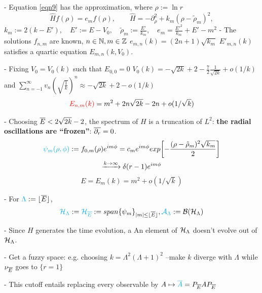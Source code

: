 {
    \color{gray}
    
    - Equation \eqref{eqn9} has the approximation, where $\rho := \ln r$
    \begin{equation}
        \label{harmonic2D}
        \hat H f(\rho) = e_m f(\rho), \qquad
        \hat H = - \partial_\rho^2 + k_m(\rho - \tilde \rho_m)^2,
    \end{equation} $
        k_m := 2(k - E'), \quad
        E' := E - V_0, \quad
        \tilde \rho_m := \frac{E'}{k_m}, \quad
        e_m = \frac{E'^2}{k_m} + E' - m^2
    $
    - The solutions $f_{n,m}$ are known, $n \in \mathbb{N}, m \in \mathbb{Z}$ \then $e_{m, n}(k) = (2n+1)\sqrt{k_m}$ \then $E'_{m,n}(k)$ satisfies a quartic equation \then $E_{m,n}(k, V_0)$.
    
    - Fixing $V_0 = V_0(k)$ such that $E_{0, 0} = 0$ \then $V_0(k) = -\sqrt{2k} + 2 - \frac{7}{2}\frac{1}{\sqrt{2k}} + o(1/k)$ and 
    $\sum_{n = -1}^\infty v_n \left( \sqrt{\frac{1}{k}} \right)^n \approx -\sqrt{2k} + 2 - o(1/k)$ \then
    \begin{equation}
        \textcolor{red}{E_{n, m}(k)} = m^2 + 2n\sqrt{2k} - 2n + o(1/\sqrt{k})
    \end{equation}
    
    - Choosing $\overline{E} < 2 \sqrt{2k} - 2$, the spectrum of $H$ is a truncation of $L^2$: \textbf{the radial oscillations are ``frozen''}: $\overline{\partial_r} = 0$.
    \begin{multline*}
        \lbtext{\psi_m(\rho, \phi)} := f_{0, m}(\rho) e^{im\phi} = c_m e^{im\phi}exp{\left[ -\frac{(\rho - \tilde \rho_m)^2 \sqrt{k_m}}{2} \right]} \\\xrightarrow{k \to \infty} \delta(r-1)e^{i m \phi}
    \end{multline*}
    \begin{equation}
        E = E_m(k) = m^2 + o(1/\sqrt{k})
    \end{equation}
    
    - For $\textcolor{cyan}{\Lambda} := \lfloor \overline{E} \rfloor$, 
    \begin{align}
        \textcolor{cyan}{\mathcal H_{\Lambda}}:= \textcolor{cyan}{\mathcal H_{\overline{E}}} := span\{\psi_m\}_{|m| \leq 
    \lfloor \overline{E} \rfloor} ,
    \textcolor{cyan}{\mathcal A_\Lambda} := \mathcal B(\mathcal H_\Lambda)
    \end{align}
    
    - Since $H$ generates the time evolution, a
    An element of $\mathcal H_\Lambda$ doesn't evolve out of $\mathcal H_\Lambda$.
    
    - Get a fuzzy space: e.g. choosing $k = \Lambda^2(\Lambda+1)^2$ --make $k$ diverge with $\Lambda$ while $\nu_{\overline{E}}$ goes to $\{r = 1\}$
    
    - This cutoff entails replacing every observable by $A \mapsto \textcolor{cyan}{\overline{A}} = P_{\overline{E}} A P_{\overline{E}}$%
}


